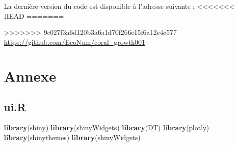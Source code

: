 \documentclass[]{report}
\newenvironment{Shaded}{\begin{snugshade}}{\end{snugshade}}
\newcommand{\KeywordTok}[1]{\textcolor[rgb]{0.13,0.29,0.53}{\textbf{#1}}}
\newcommand{\NormalTok}[1]{#1}
\begin{document}
La dernière version du code est disponible à l'adresse suivante :
<<<<<<< HEAD
=======

>>>>>>> 9c027f3a6d120b3a6a1d70f266e15f6a12e4e577
\url{https://github.com/EcoNum/coral_growth001}

\chapter{Annexe}\label{annexe}

\section{ui.R}\label{ui.r}

\begin{Shaded}
\begin{Highlighting}[]
\KeywordTok{library}\NormalTok{(shiny)}
\KeywordTok{library}\NormalTok{(shinyWidgets)}
\KeywordTok{library}\NormalTok{(DT)}
\KeywordTok{library}\NormalTok{(plotly)}
\KeywordTok{library}\NormalTok{(shinythemes)}
\KeywordTok{library}\NormalTok{(shinyWidgets)}



\end{Highlighting}
\end{Shaded}
\end{document}

